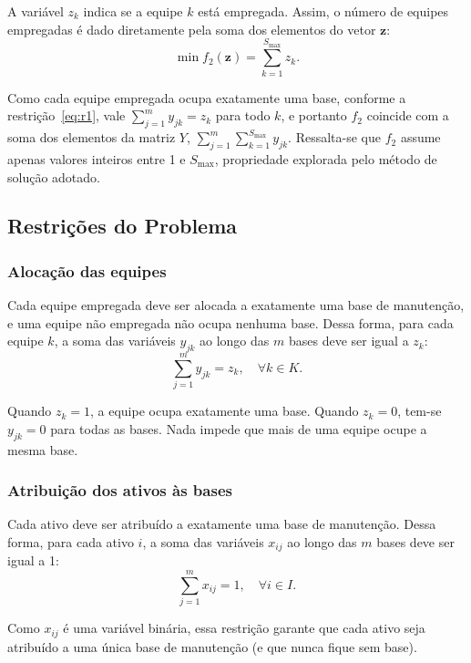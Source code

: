 \documentclass[conference]{IEEEtran}
\begin{document}
A variável $z_k$ indica se a equipe $k$ está empregada. Assim, o número de equipes empregadas é dado diretamente pela soma dos elementos do vetor $\mathbf{z}$:
\begin{equation}
\min f_2(\mathbf{z}) = \sum_{k=1}^{S_{\max}} z_k.
\label{eq:f2}
\end{equation}

Como cada equipe empregada ocupa exatamente uma base, conforme a restrição~\eqref{eq:r1}, vale $\sum_{j=1}^{m} y_{jk} = z_k$ para todo $k$, e portanto $f_2$ coincide com a soma dos elementos da matriz $Y$, $\sum_{j=1}^{m}\sum_{k=1}^{S_{\max}} y_{jk}$. Ressalta-se que $f_2$ assume apenas valores inteiros entre 1 e $S_{\max}$, propriedade explorada pelo método de solução adotado.

\subsection{Restrições do Problema}

\subsubsection{Alocação das equipes}
Cada equipe empregada deve ser alocada a exatamente uma base de manutenção, e uma equipe não empregada não ocupa nenhuma base. Dessa forma, para cada equipe $k$, a soma das variáveis $y_{jk}$ ao longo das $m$ bases deve ser igual a $z_k$:
\begin{equation}
\sum_{j=1}^{m} y_{jk} = z_k, \quad \forall k \in K.
\label{eq:r1}
\end{equation}

Quando $z_k = 1$, a equipe ocupa exatamente uma base. Quando $z_k = 0$, tem-se $y_{jk} = 0$ para todas as bases. Nada impede que mais de uma equipe ocupe a mesma base.

\subsubsection{Atribuição dos ativos às bases}
Cada ativo deve ser atribuído a exatamente uma base de manutenção. Dessa forma, para cada ativo $i$, a soma das variáveis $x_{ij}$ ao longo das $m$ bases deve ser igual a 1:
\begin{equation}
\sum_{j=1}^{m} x_{ij} = 1, \quad \forall i \in I.
\label{eq:r2}
\end{equation}

Como $x_{ij}$ é uma variável binária, essa restrição garante que cada ativo seja atribuído a uma única base de manutenção (e que nunca fique sem base).
\end{document}
